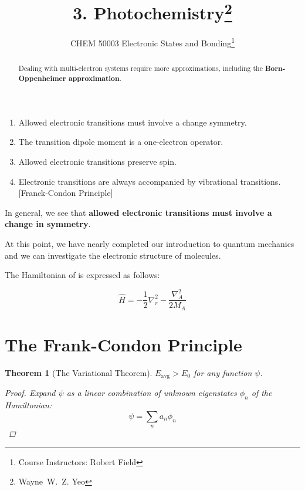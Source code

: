 \documentclass[a4paper]{tufte-handout}
\title{3. Photochemistry\thanks{Wayne~W.~Z. Yeo}}
\author[ESB]{\textnormal{CHEM 50003} Electronic States and Bonding\thanks{Course Instructors: Robert Field}}
\newtheorem{theorem}{Theorem}
\theoremstyle{definition}
\begin{document}
\maketitle%

\begin{abstract}
\noindent
Dealing with multi-electron systems require more approximations, including the \textbf{Born-Oppenheimer approximation}.

\end{abstract}

\begin{enumerate}
  \item Allowed electronic transitions must involve a change symmetry.
  \item The transition dipole moment is a one-electron operator.
  \item Allowed electronic transitions preserve spin.
  \item Electronic transitions are always accompanied by vibrational transitions. [Franck-Condon Principle]
\end{enumerate}


In general, we see that \textbf{allowed electronic transitions must involve a change in symmetry}. \cite{atkins2014atkins}

At this point, we have nearly completed our introduction to quantum mechanics 
and we can investigate the electronic structure of molecules.

The Hamiltonian of  is expressed as follows:

\begin{equation}
  \hat{H} = -\frac{1}{2}\nabla^2_r - \frac{\nabla^2_A}{2M_A}
\end{equation}

\section{The Frank-Condon Principle}

\begin{theorem}[The Variational Theorem] $E_{\mathrm{avg}} > E_0$ for any function $\psi$. 

  \begin{proof}
    Expand $\psi$ as a linear combination of unknown eigenstates $\phi_n$ of the Hamiltonian:
    \begin{equation*}
      \psi = \sum_n a_n \phi_n
    \end{equation*}
  \end{proof}
  
\end{theorem}
\end{document}
